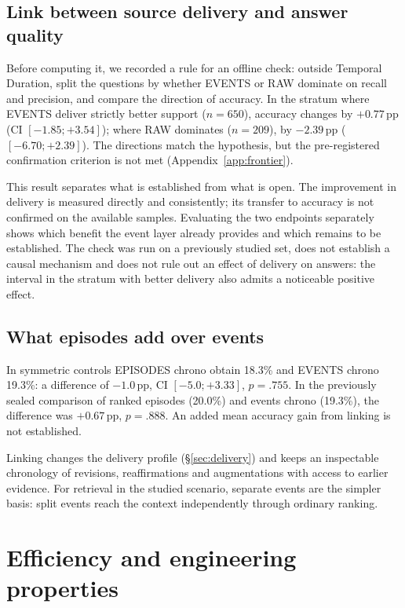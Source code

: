 \documentclass[11pt,a4paper]{article}
\newcommand{\raw}{RAW}
\newcommand{\events}{EVENTS}
\newcommand{\episodes}{EPISODES}
\newcommand{\pp}{\,\text{pp}}
\begin{document}
\subsection{Link between source delivery and answer quality}
\label{sec:frontier}

Before computing it, we recorded a rule for an offline check: outside Temporal
Duration, split the questions by whether \events{} or \raw{} dominate on recall and
precision, and compare the direction of accuracy. In the stratum where \events{}
deliver strictly better support ($n=650$), accuracy changes by $+0.77\pp$ (CI
$[-1.85;+3.54]$); where \raw{} dominates ($n=209$), by $-2.39\pp$ ($[-6.70;+2.39]$).
The directions match the hypothesis, but the pre-registered confirmation criterion
is not met (Appendix~\ref{app:frontier}).

This result separates what is established from what is open. The improvement in
delivery is measured directly and consistently; its transfer to accuracy is not
confirmed on the available samples. Evaluating the two endpoints separately shows
which benefit the event layer already provides and which remains to be established.
The check was run on a previously studied set, does not establish a causal mechanism
and does not rule out an effect of delivery on answers: the interval in the stratum
with better delivery also admits a noticeable positive effect.

\subsection{What episodes add over events}
\label{sec:episodes}

In symmetric controls \episodes{} chrono obtain 18.3\% and \events{} chrono 19.3\%: a
difference of $-1.0\pp$, CI $[-5.0;+3.33]$, $p=.755$. In the previously sealed
comparison of ranked episodes (20.0\%) and events chrono (19.3\%), the difference was
$+0.67\pp$, $p=.888$. An added mean accuracy gain from linking is not established.

Linking changes the delivery profile (§\ref{sec:delivery}) and keeps an inspectable
chronology of revisions, reaffirmations and augmentations with access to earlier
evidence. For retrieval in the studied scenario, separate events are the simpler
basis: split events reach the context independently through ordinary ranking.

\section{Efficiency and engineering properties}
\end{document}
